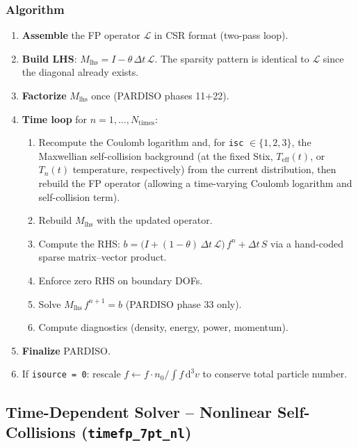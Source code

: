 \documentclass[11pt,a4paper]{article}
\newcommand{\dt}{\Delta t}
\newcommand{\Lcal}{\mathcal{L}}
\begin{document}
\subsubsection{Algorithm}

\begin{enumerate}
  \item \textbf{Assemble} the FP operator $\Lcal$ in CSR format (two-pass loop).
  \item \textbf{Build LHS}: $M_\mathrm{lhs} = I - \theta\,\dt\,\Lcal$.  The sparsity
        pattern is identical to $\Lcal$ since the diagonal already exists.
  \item \textbf{Factorize} $M_\mathrm{lhs}$ once (PARDISO phases 11+22).
  \item \textbf{Time loop} for $n = 1, \ldots, N_\mathrm{times}$:
        \begin{enumerate}
          \item Recompute the Coulomb logarithm and, for
                \texttt{isc} $\in \{1,2,3\}$, the Maxwellian self-collision
                background (at the fixed Stix, $T_\mathrm{eff}(t)$, or $T_n(t)$
                temperature, respectively) from the current distribution, then
                rebuild the FP operator (allowing a time-varying Coulomb logarithm
                and self-collision term).
          \item Rebuild $M_\mathrm{lhs}$ with the updated operator.
          \item Compute the RHS:
                $b = \bigl(I + (1-\theta)\,\dt\,\Lcal\bigr)\,f^n + \dt\,S$
                via a hand-coded sparse matrix--vector product.
          \item Enforce zero RHS on boundary DOFs.
          \item Solve $M_\mathrm{lhs}\,f^{n+1} = b$ (PARDISO phase 33 only).
          \item Compute diagnostics (density, energy, power, momentum).
        \end{enumerate}
  \item \textbf{Finalize} PARDISO.
  \item If \texttt{isource = 0}: rescale $f \leftarrow f \cdot n_0/\int f\,\mathrm{d}^3v$
        to conserve total particle number.
\end{enumerate}

\subsection{Time-Dependent Solver -- Nonlinear Self-Collisions (\texttt{timefp\_7pt\_nl})}
\end{document}

